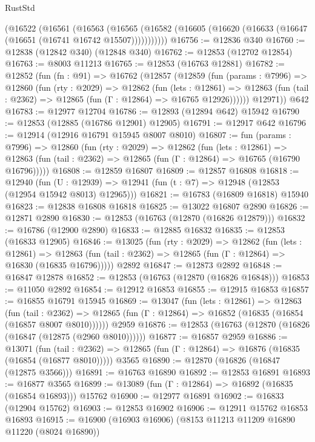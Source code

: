 \begin{lexlean}{RustStd}
\begin{coremodule}
    (@16522
      (@16561
        (@16563
          (@16565 (@16582 (@16605 (@16620 (@16633 (@16647 (@16651 (@16741 @16742 @15507)))))))))))
@16756 := @12836 @340
@16760 := @12838 (@12842 @340) (@12848 @340)
@16762 := @12853 (@12702 @12854)
@16763 := @8003 @11213
@16765 := @12853 (@16763 @12881)
@16782 := @12852
    (fun (fn : @91) =>
    @16762
      (@12857
        (@12859
          (fun (params : @7996) =>
          @12860
            (fun (rty : @2029) =>
            @12862
              (fun (lets : @12861) =>
              @12863 (fun (tail : @2362) => @12865 (fun (Γ : @12864) => @16765 @12926))))))
        @12971))
    @642
@16783 := @12977 @12704
@16786 := @12893 (@12894 @642) @15942
@16790 := @12853 (@12885 (@16786 @12901) @12905)
@16791 := @12917 @642
@16796 := @12914 (@12916 @16791 @15945 @8007 @8010)
@16807 := fun (params : @7996) =>
  @12860
    (fun (rty : @2029) =>
    @12862
      (fun (lets : @12861) =>
      @12863 (fun (tail : @2362) => @12865 (fun (Γ : @12864) => @16765 (@16790 @16796)))))
@16808 := @12859 @16807
@16809 := @12857 @16808
@16818 := @12940
    (fun (U : @12939) => @12941 (fun (t : @7) => @12948 (@12853 (@12954 @15942 @8013) @12965)))
@16821 := @16783 (@16809 @16818) @15940
@16823 := @12838 @16808 @16818
@16825 := @13022 @16807 @2890
@16826 := @12871 @2890
@16830 := @12853 (@16763 (@12870 (@16826 @12879)))
@16832 := @16786 (@12900 @2890)
@16833 := @12885 @16832
@16835 := @12853 (@16833 @12905)
@16846 := @13025
    (fun (rty : @2029) =>
    @12862
      (fun (lets : @12861) =>
      @12863 (fun (tail : @2362) => @12865 (fun (Γ : @12864) => @16830 (@16835 @16796)))))
    @2892
@16847 := @12873 @2892
@16848 := @16847 @12878
@16852 := @12853 (@16763 (@12870 (@16826 @16848)))
@16853 := @11050 @2892
@16854 := @12912 @16853
@16855 := @12915 @16853
@16857 := @16855 @16791 @15945
@16869 := @13047
    (fun (lets : @12861) =>
    @12863
      (fun (tail : @2362) =>
      @12865 (fun (Γ : @12864) => @16852 (@16835 (@16854 (@16857 @8007 @8010))))))
    @2959
@16876 := @12853 (@16763 (@12870 (@16826 (@16847 (@12875 (@2960 @8010))))))
@16877 := @16857 @2959
@16886 := @13071
    (fun (tail : @2362) => @12865 (fun (Γ : @12864) => @16876 (@16835 (@16854 (@16877 @8010)))))
    @3565
@16890 := @12870 (@16826 (@16847 (@12875 @3566)))
@16891 := @16763 @16890
@16892 := @12853 @16891
@16893 := @16877 @3565
@16899 := @13089 (fun (Γ : @12864) => @16892 (@16835 (@16854 @16893))) @15762
@16900 := @12977 @16891
@16902 := @16833 (@12904 @15762)
@16903 := @12853 @16902
@16906 := @12911 @15762 @16853 @16893
@16915 := @16900 (@16903 @16906) (@8153 @11213 @11209 @16890 @11220 (@8024 @16890))

\end{coremodule}
\end{lexlean}

